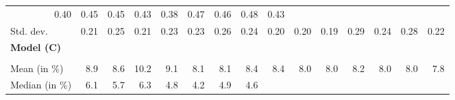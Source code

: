\begin{tabular}{lllllllllllllll}
  \multicolumn{1}{r}{0.40} &
  \multicolumn{1}{r}{0.45} &
  \multicolumn{1}{r}{0.45} &
  \multicolumn{1}{r}{0.43} &
  \multicolumn{1}{r}{0.38} &
  \multicolumn{1}{r}{0.47} &
  \multicolumn{1}{r}{0.46} &
  \multicolumn{1}{r}{0.48} &
  \multicolumn{1}{r}{0.43} \\
\multicolumn{1}{l}{\hspace{2em}Std. dev.} &
  \multicolumn{1}{|r}{0.21} &
  \multicolumn{1}{r}{0.25} &
  \multicolumn{1}{r}{0.21} &
  \multicolumn{1}{r}{0.23} &
  \multicolumn{1}{r}{0.23} &
  \multicolumn{1}{r}{0.26} &
  \multicolumn{1}{r}{0.24} &
  \multicolumn{1}{r}{0.20} &
  \multicolumn{1}{r}{0.20} &
  \multicolumn{1}{r}{0.19} &
  \multicolumn{1}{r}{0.29} &
  \multicolumn{1}{r}{0.24} &
  \multicolumn{1}{r}{0.28} &
  \multicolumn{1}{r}{0.22} \\
\multicolumn{1}{l}{{\textbf{Model (C)}}} &
  \multicolumn{1}{|r}{} &
  \multicolumn{1}{r}{} &
  \multicolumn{1}{r}{} &
  \multicolumn{1}{r}{} &
  \multicolumn{1}{r}{} &
  \multicolumn{1}{r}{} &
  \multicolumn{1}{r}{} &
  \multicolumn{1}{r}{} &
  \multicolumn{1}{r}{} &
  \multicolumn{1}{r}{} &
  \multicolumn{1}{r}{} &
  \multicolumn{1}{r}{} &
  \multicolumn{1}{r}{} &
  \multicolumn{1}{r}{} \\
\multicolumn{1}{l}{\hspace{1em}{\textit{Additive term} ($\widehat{t}^{add}/\widetilde{p}$)}} &
  \multicolumn{1}{|r}{} &
  \multicolumn{1}{r}{} &
  \multicolumn{1}{r}{} &
  \multicolumn{1}{r}{} &
  \multicolumn{1}{r}{} &
  \multicolumn{1}{r}{} &
  \multicolumn{1}{r}{} &
  \multicolumn{1}{r}{} &
  \multicolumn{1}{r}{} &
  \multicolumn{1}{r}{} &
  \multicolumn{1}{r}{} &
  \multicolumn{1}{r}{} &
  \multicolumn{1}{r}{} &
  \multicolumn{1}{r}{} \\
\multicolumn{1}{l}{\hspace{2em}Mean (in $\%$)} &
  \multicolumn{1}{|r}{8.9} &
  \multicolumn{1}{r}{8.6} &
  \multicolumn{1}{r}{10.2} &
  \multicolumn{1}{r}{9.1} &
  \multicolumn{1}{r}{8.1} &
  \multicolumn{1}{r}{8.1} &
  \multicolumn{1}{r}{8.4} &
  \multicolumn{1}{r}{8.4} &
  \multicolumn{1}{r}{8.0} &
  \multicolumn{1}{r}{8.0} &
  \multicolumn{1}{r}{8.2} &
  \multicolumn{1}{r}{8.0} &
  \multicolumn{1}{r}{8.0} &
  \multicolumn{1}{r}{7.8} \\
\multicolumn{1}{l}{\hspace{2em}Median (in $\%$)} &
  \multicolumn{1}{|r}{6.1} &
  \multicolumn{1}{r}{5.7} &
  \multicolumn{1}{r}{6.3} &
  \multicolumn{1}{r}{4.8} &
  \multicolumn{1}{r}{4.2} &
  \multicolumn{1}{r}{4.9} &
  \multicolumn{1}{r}{4.6} &

\end{tabular}
